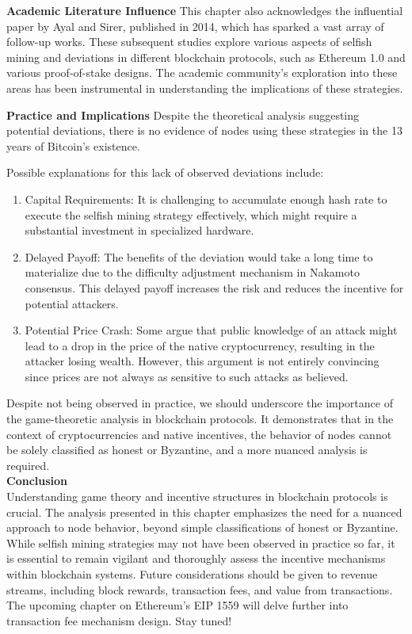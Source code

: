 \noindent
\textbf{Academic Literature Influence}
This chapter also acknowledges the influential paper by Ayal and Sirer, published in 2014, which has sparked a vast array of follow-up works. These subsequent studies explore various aspects of selfish mining and deviations in different blockchain protocols, such as Ethereum 1.0 and various proof-of-stake designs. The academic community's exploration into these areas has been instrumental in understanding the implications of these strategies.

\noindent
\textbf{Practice and Implications}
Despite the theoretical analysis suggesting potential deviations, there is no evidence of nodes using these strategies in the 13 years of Bitcoin's existence.

Possible explanations for this lack of observed deviations include:
\begin{enumerate}
    \item Capital Requirements: It is challenging to accumulate enough hash rate to execute the selfish mining strategy effectively, which might require a substantial investment in specialized hardware.
    \item Delayed Payoff: The benefits of the deviation would take a long time to materialize due to the difficulty adjustment mechanism in Nakamoto consensus. This delayed payoff increases the risk and reduces the incentive for potential attackers.
    \item Potential Price Crash: Some argue that public knowledge of an attack might lead to a drop in the price of the native cryptocurrency, resulting in the attacker losing wealth. However, this argument is not entirely convincing since prices are not always as sensitive to such attacks as believed.
\end{enumerate}
Despite not being observed in practice, we should underscore the importance of the game-theoretic analysis in blockchain protocols. It demonstrates that in the context of cryptocurrencies and native incentives, the behavior of nodes cannot be solely classified as honest or Byzantine, and a more nuanced analysis is required.\\

\noindent
\textbf{Conclusion}\\
Understanding game theory and incentive structures in blockchain protocols is crucial. The analysis presented in this chapter emphasizes the need for a nuanced approach to node behavior, beyond simple classifications of honest or Byzantine. While selfish mining strategies may not have been observed in practice so far, it is essential to remain vigilant and thoroughly assess the incentive mechanisms within blockchain systems. Future considerations should be given to revenue streams, including block rewards, transaction fees, and value from transactions. The upcoming chapter on Ethereum's EIP 1559 will delve further into transaction fee mechanism design. Stay tuned!


